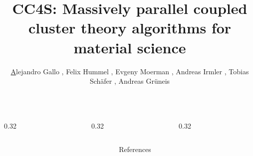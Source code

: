 \documentclass[final]{beamer}
\title{
  CC4S: Massively parallel coupled cluster theory algorithms for material
  science
}
\author{%
    { \underline Alejandro Gallo}%
  , Felix Hummel
  , Evgeny Moerman
  , Andreas Irmler%
  , Tobias Schäfer%
  , Andreas Grüneis%
  }
\institute[]{
  Technical University of Vienna
}
\begin{document}
\newcommand{\posterColumnWidth}{0.32\textwidth}
\begin{frame}[fragile]{}
  

  \begin{columns}[T]


    \begin{column}{\posterColumnWidth}
      
      
      
      
    \end{column}

    \nocite{solomonik2014}
    \begin{column}{\posterColumnWidth}
      \newcommand{\scalingWidth}{0.8\textwidth}
      
      \vspace*{-3.0cm}
      
      
    \end{column}


    \begin{column}{\posterColumnWidth}

      \newcommand{\scalingWidth}{0.8\textwidth}
      
      \vspace*{-3.0cm}
      


    \end{column}


  \end{columns}

  \vspace*{1cm}

  \begin{columns}[T]
    \begin{column}{0.32\textwidth}
      
    \end{column}
    \begin{column}{0.64\textwidth}
      \begin{block}{\large References}
        \tiny
        \printbibliography
      \end{block}
    \end{column}
  \end{columns}

\end{frame}
\end{document}
